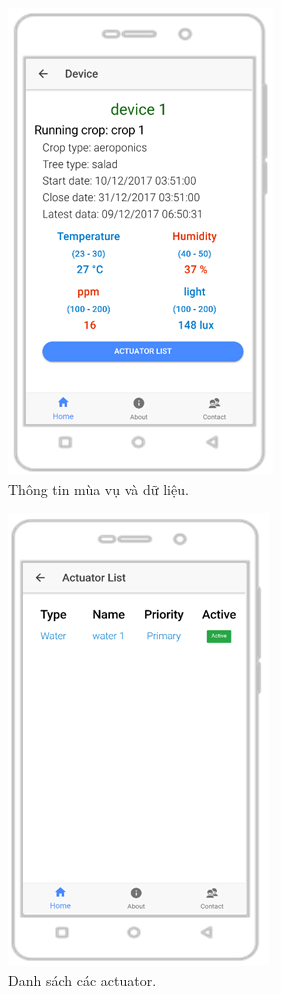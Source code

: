 \documentclass[a4paper,12pt,oneside]{article}
\begin{document}
\begin{figure}[H]
\centering
\includegraphics[scale=1]{hinh/mobile_crop.png}
\caption{Thông tin mùa vụ và dữ liệu.}
\end{figure}

\begin{figure}[H]
\centering
\includegraphics[scale=1]{hinh/mobile_actuator_list.png}
\caption{Danh sách các actuator.}
\end{figure}
\end{document}

